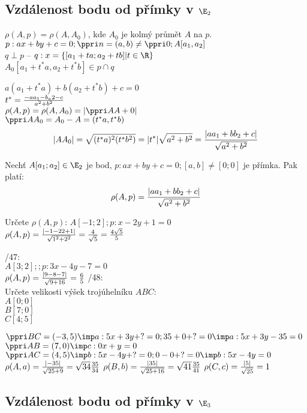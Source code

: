 \subsection{Vzdálenost bodu od přímky v $\E_2$}

\Poz
$ \rho(A,p) = \rho(A,A_0)$, kde $A_0$ je kolmý průmět $A$ na $p$.\\
$p:ax+by+c=0; \ve n = (a,b)\ne \ve 0; A[a_1,a_2]$\\
$q\perp p$ -- $q:x=\zs{[a_1+ta;a_2+tb]|t\in\R}$\\
$A_0[a_1+t^*a,a_2+t^*b] \in p \cap q$

$a(a_1 + t^*a)+b(a_2+t^*b)+c=0$\\
$t^* = \frac{-aa_1-b_a2-c}{a^2+b^2}$\\
$\rho(A,p) = \rho(A,A_0) = |\ve{AA+0}|$\\
$\ve{AA_0} = A_0 - A = (t^*a,t^*b)$
$$ |AA_0| = \sqrt{(t^*a)^2 (t^*b^2)} = |t^*|\*\sqrt{a^2+b^2} = \f{|aa_1+bb_2+c|}{\sqrt{a^2+b^2}}$$

\V Nechť $A[a_1;a_2]\in\E_2$ je bod, $p:ax+by+c = 0;[a,b]\ne[0;0]$ je přímka.
Pak platí:
$$ \rho(A,p) =  \frac{|aa_1+bb_2+c|}{\sqrt{a^2+b^2}}$$

\Pr Určete $\rho(A,p)$:
$A[-1;2];p:x-2y+1=0$\\
$\rho(A,p) = \f{|-1 - 2\*2+1|}{\sqrt{1^2+2^2}} = \f4{\sqrt 5} = \f{4\sqrt 5}5$

/47:\\
$A[3;2];;p:3x-4y-7=0$\\
$\rho(A,p) = \frac{|9 - 8-7|}{\sqrt{9+16}} = \frac6{5}$
/48:\\
Určete velikosti výšek trojúhelníku $ABC$:\\
$A[0;0]$\\
$B[7;0]$\\
$C[4;5]$

$\ve{BC} = (-3,5) \imp a: 5x+3y+?=0; 35+0+?=0 \imp a: 5x+3y-35=0$\\
$\ve{AB} = (7,0) \imp c: 0x+y=0$\\
$\ve{AC} = (4,5) \imp b: 5x-4y+?=0; 0-0+?=0 \imp b: 5x-4y=0$\\

$\rho(A,a) = \frac{|-35|}{\sqrt{25+9}} = \sqrt{34}\frac{35}{34}$
$\rho(B,b) = \frac{|35|}{\sqrt{25+16}} = \sqrt{41}\frac{35}{41}$
$\rho(C,c) = \frac{|5|}{\sqrt{25}} = 1$

\subsection{Vzdálenost bodu od přímky v $\E_3$}

